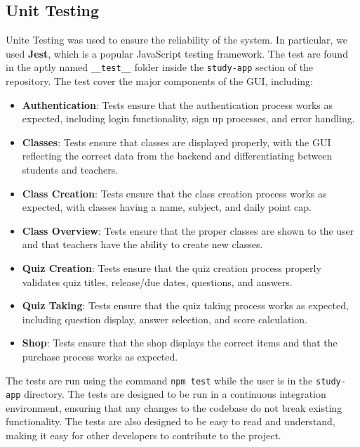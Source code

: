 \subsection{Unit Testing}
Unite Testing was used to ensure the reliability of the system. In particular, we used \textbf{Jest}, which is a popular JavaScript testing framework. The test are found in the aptly named \texttt{\_\_test\_\_} folder inside the \texttt{study-app} section of the repository. The test cover the major components of the GUI, including:
\begin{itemize}
    \item \textbf{Authentication}: Tests ensure that the authentication process works as expected, including login functionality, sign up processes, and error handling.
    \item \textbf{Classes}: Tests ensure that classes are displayed properly, with the GUI reflecting the correct data from the backend and differentiating between students and teachers.
    \item \textbf{Class Creation}: Tests ensure that the class creation process works as expected, with classes having a name, subject, and daily point cap.
    \item \textbf{Class Overview}: Tests ensure that the proper classes are shown to the user and that teachers have the ability to create new classes.
    \item \textbf{Quiz Creation}: Tests ensure that the quiz creation process properly validates quiz titles, release/due dates, questions, and answers.
    \item \textbf{Quiz Taking}: Tests ensure that the quiz taking process works as expected, including question display, answer selection, and score calculation.
    \item \textbf{Shop}: Tests ensure that the shop displays the correct items and that the purchase process works as expected.
\end{itemize}

The tests are run using the command \texttt{npm test} while the user is in the \texttt{study-app} directory. The tests are designed to be run in a continuous integration environment, ensuring that any changes to the codebase do not break existing functionality. The tests are also designed to be easy to read and understand, making it easy for other developers to contribute to the project.